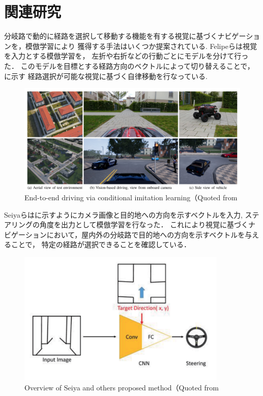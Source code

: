 \clearpage
\section{関連研究}
分岐路で動的に経路を選択して移動する機能を有する視覚に基づくナビゲーションを，模倣学習により
獲得する手法はいくつか提案されている.
Felipeら\cite{codevilla2018endtoend}は視覚を入力とする模倣学習を，
左折や右折などの行動ごとにモデルを分けて行った．
このモデルを目標とする経路方向のベクトルによって切り替えることで，に示す
経路選択が可能な視覚に基づく自律移動を行なっている.
\begin{figure}[htbp]
    \centering
     \includegraphics[width=120mm]{images/pdf/fleipe.pdf}
     \caption[End-to-end driving via conditional imitation learning]{End-to-end driving via conditional imitation learning（Quoted from\cite{codevilla2018endtoend}}
     \label{fig:felipe}
\end{figure}

Seiyaら\cite{seiya2018}はに示すようにカメラ画像と目的地への方向を示すベクトルを入力,
ステアリングの角度を出力として模倣学習を行なった．
これにより視覚に基づくナビゲーションにおいて，屋内外の分岐路で目的地への方向を示すベクトルを与えることで，
特定の経路が選択できることを確認している．
\begin{figure}[htbp]
    \centering
     \includegraphics[width=100mm]{images/pdf/seiya.pdf}
     \caption[Overview of Seiya and others proposed method]{Overview of Seiya and others proposed method（Quoted from\cite{seiya2018}}
     \label{fig:seiya}
\end{figure}

